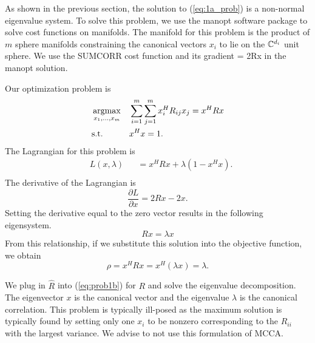 
As shown in the previous section, the solution to (\ref{eq:1a_prob}) is a non-normal
eigenvalue system. To solve this problem, we use the manopt software package to solve cost
functions on manifolds. The manifold for this problem is the product of $m$ sphere
manifolds constraining the canonical vectors $x_i$ to lie on the $\mathbb{C}^{d_i}$ unit
sphere. We use the SUMCORR cost function and its gradient
\be
{}= 2Rx
\ee
in the manopt solution.

Our optimization problem is
\begin{equation*}
\begin{aligned}
&\mathop{\rm argmax}_{x_1,\dots,x_m}&&\sum_{i=1}^m\sum_{j=1}^mx_i^HR_{ij}x_j=x^HRx\\
&\text{s.t.} &&x^Hx  = 1.
\end{aligned}
\end{equation*}
The Lagrangian for this problem is
\begin{equation*}
\begin{aligned}
&L(x,\lambda) &&= x^HR x + \lambda(1-x^Hx).\\
\end{aligned}
\end{equation*}
The derivative of the Lagrangian is
\begin{equation*}
\frac{\partial L}{\partial x} = 2Rx - 2x.
\end{equation*}
Setting the derivative equal to the zero vector results in the following eigensystem.
\begin{equation}\label{eq:prob1b}
  Rx = \lambda x
\end{equation}
From this relationship, if we substitute this solution into the objective function, we
obtain
\begin{equation}\label{eq:rho1b}
  \rho = x^H R x = x^H(\lambda x) = \lambda.
\end{equation}

We plug in $\widehat{R}$ into (\ref{eq:prob1b}) for $R$ and solve the eigenvalue
decomposition. The eigenvector $x$ is the canonical vector and the eigenvalue $\lambda$ is
the canonical correlation. This problem is typically ill-posed as the maximum solution is
typically found by setting only one $x_i$ to be nonzero corresponding to the $R_{ii}$ with
the largest variance. We advise to not use this formulation of MCCA.

